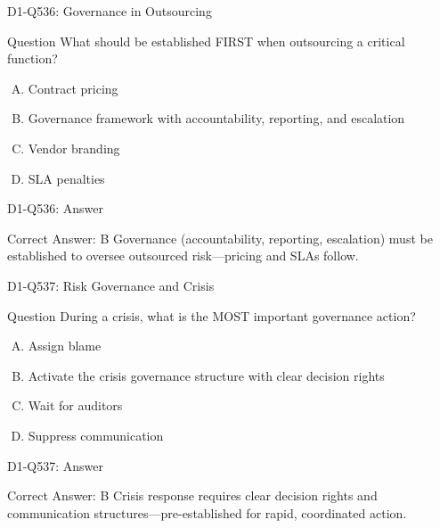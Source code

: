 \documentclass{beamer}
\begin{document}
\begin{frame}{D1-Q536: Governance in Outsourcing}
	\begin{block}{Question}
		What should be established FIRST when outsourcing a critical function?
	\end{block}
	\begin{enumerate}[(A)]
		\item Contract pricing
		\item Governance framework with accountability, reporting, and escalation
		\item Vendor branding
		\item SLA penalties
	\end{enumerate}
\end{frame}
\begin{frame}{D1-Q536: Answer}
	\begin{block}{Correct Answer: B}
		Governance (accountability, reporting, escalation) must be established to oversee outsourced risk—pricing and SLAs follow.
	\end{block}
\end{frame}

\begin{frame}{D1-Q537: Risk Governance and Crisis}
	\begin{block}{Question}
		During a crisis, what is the MOST important governance action?
	\end{block}
	\begin{enumerate}[(A)]
		\item Assign blame
		\item Activate the crisis governance structure with clear decision rights
		\item Wait for auditors
		\item Suppress communication
	\end{enumerate}
\end{frame}
\begin{frame}{D1-Q537: Answer}
	\begin{block}{Correct Answer: B}
		Crisis response requires clear decision rights and communication structures—pre-established for rapid, coordinated action.
	\end{block}
\end{frame}
\end{document}
